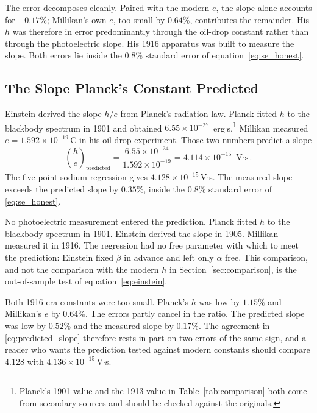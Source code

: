 \documentclass[12pt]{article}
\begin{document}
\noindent The error decomposes cleanly.  Paired with the modern $e$, the
slope alone accounts for $-0.17\%$; Millikan's own $e$, too small by
$0.64\%$, contributes the remainder.  His $h$ was therefore in error
predominantly through the oil-drop constant rather than through the
photoelectric slope.  His 1916 apparatus was built to measure the slope.
Both errors lie inside the $0.8\%$ standard error of
equation~\eqref{eq:se_honest}.

\subsection{The Slope Planck's Constant Predicted}
\label{sec:prediction}

Einstein derived the slope $h/e$ from Planck's radiation law.  Planck fitted
$h$ to the blackbody spectrum in 1901 and obtained $6.55\times10^{-27}$\,%
erg$\cdot$s.\footnote{Planck's 1901 value and the 1913 value in
Table~\ref{tab:comparison} both come from secondary sources and should be
checked against the originals.}  Millikan measured
$e = 1.592\times10^{-19}$\,C in his oil-drop experiment.  Those two numbers
predict a slope
\begin{equation}\label{eq:predicted_slope}
  \left(\frac{h}{e}\right)_{\text{predicted}}
  = \frac{6.55\times10^{-34}}{1.592\times10^{-19}}
  = 4.114\times10^{-15}\text{ V$\cdot$s}.
\end{equation}
The five-point sodium regression gives $4.128\times10^{-15}$\,V$\cdot$s.  The
measured slope exceeds the predicted slope by $0.35\%$, inside the $0.8\%$
standard error of \eqref{eq:se_honest}.

No photoelectric measurement entered the prediction.  Planck fitted $h$ to the
blackbody spectrum in 1901.  Einstein derived the slope in 1905.  Millikan
measured it in 1916.  The regression had no free parameter with which to meet
the prediction: Einstein fixed $\beta$ in advance and left only $\alpha$ free.
This comparison, and not the comparison with the modern $h$ in
Section~\ref{sec:comparison}, is the out-of-sample test of
equation~\eqref{eq:einstein}.

Both 1916-era constants were too small.  Planck's $h$ was low by $1.15\%$ and
Millikan's $e$ by $0.64\%$.  The errors partly cancel in the ratio.  The
predicted slope was low by $0.52\%$ and the measured slope by $0.17\%$.  The
agreement in \eqref{eq:predicted_slope} therefore rests in part on two errors
of the same sign, and a reader who wants the prediction tested against modern
constants should compare $4.128$ with $4.136\times10^{-15}$\,V$\cdot$s.
\end{document}
